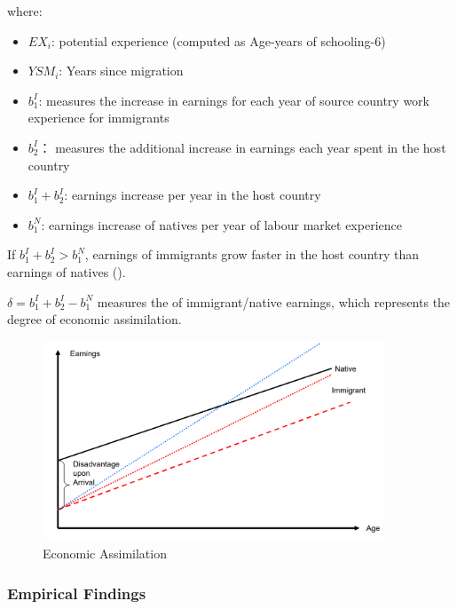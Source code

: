             where:
            
            \begin{itemize}
                \item $EX_i$: potential experience (computed as Age-years of schooling-6)
                \item $YSM_i$: Years since migration
                \item $b_1^I$:  measures the increase in earnings for each year of source country work experience for immigrants
                \item $b_2^I$： measures the additional increase in earnings each year spent in the host country
                \item $b_1^I+b_2^I$: earnings increase per year in the host country
                \item $b_1^N$: earnings increase of natives per year of labour market experience
            \end{itemize}

            If $b_1^I+b_2^I > b_1^N$, earnings of immigrants grow faster in the host country than earnings of natives ().
            
            $\delta=b_1^I+b_2^I-b_1^N$ measures the  of immigrant/native earnings, which represents the degree of economic assimilation.

            \begin{figure}[H]
                \centering
                \includegraphics[width=4in]{images/ch11/13.png}
                \caption{Economic Assimilation}
            \end{figure}

        \subsubsection{Empirical Findings}

